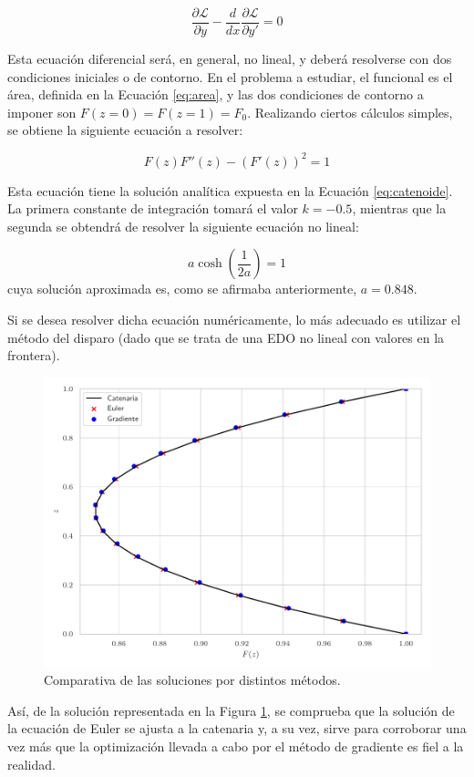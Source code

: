 \begin{equation}
    \frac{\partial\mathcal{L}}{\partial y} - \frac{d}{dx}\frac{\partial\mathcal{L}}{\partial y'} = 0
\end{equation}

Esta ecuación diferencial será, en general, no lineal, y deberá resolverse con dos condiciones iniciales o de contorno. En el problema a estudiar, el funcional es el área, definida en la Ecuación \ref{eq:area}, y las dos condiciones de contorno a imponer son $F(z = 0) = F(z = 1) = F_0$. Realizando ciertos cálculos simples, se obtiene la siguiente ecuación a resolver: 

\begin{equation}
    F(z) F''(z) - (F'(z))^2 = 1
\end{equation}

Esta ecuación tiene la solución analítica expuesta en la Ecuación \ref{eq:catenoide}. La primera constante de integración tomará el valor $k = -0.5$, mientras que la segunda se obtendrá de resolver la siguiente ecuación no lineal: 

 \begin{equation}
     a \cosh \left( \frac{1}{2a} \right) = 1
 \end{equation}
 cuya solución aproximada es, como se afirmaba anteriormente, $a = 0.848$. 

Si se desea resolver dicha ecuación numéricamente, lo más adecuado es utilizar el método del disparo (dado que se trata de una EDO no lineal con valores en la frontera). 

\begin{figure}[h]
    \centering
    \includegraphics[width = 0.6 \linewidth]{Figures/01/sol_euler.pdf}
    \caption{Comparativa de las soluciones por distintos métodos.}
    \label{fig:sol_euler}
\end{figure}

Así, de la solución representada en la Figura \ref{fig:sol_euler}, se comprueba que la solución de la ecuación de Euler se ajusta a la catenaria y, a su vez, sirve para corroborar una vez más que la optimización llevada a cabo por el método de gradiente es fiel a la realidad.

